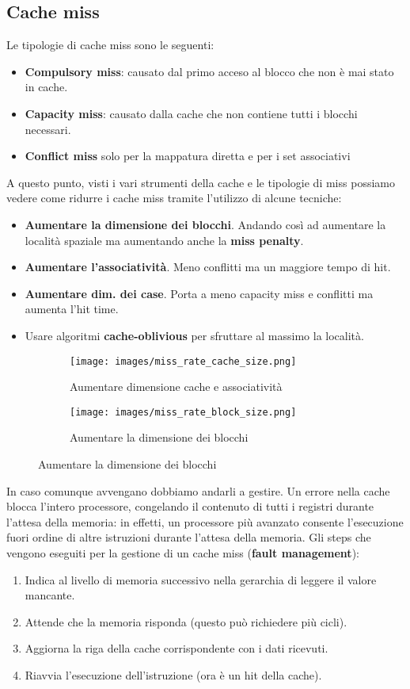 \subsection{Cache miss}
Le tipologie di cache miss sono le seguenti:
\begin{itemize}
	\item \textbf{Compulsory miss}: causato dal primo acceso al blocco che non è mai stato in cache.
	\item \textbf{Capacity miss}: causato dalla cache che non contiene tutti i blocchi necessari.
	\item \textbf{Conflict miss} solo per la mappatura diretta e per i set associativi
\end{itemize}
A questo punto, visti i vari strumenti della cache e le tipologie di miss possiamo vedere come ridurre i cache miss tramite l'utilizzo di alcune tecniche:
\begin{itemize}
	\item \textbf{Aumentare la dimensione dei blocchi}. Andando così ad aumentare la località spaziale ma aumentando anche la \textbf{miss penalty}.
	\item \textbf{Aumentare l'associatività}. Meno conflitti ma un maggiore tempo di hit.
	\item \textbf{Aumentare dim. dei case}. Porta a meno capacity miss e conflitti ma aumenta l'hit time.
	\item Usare algoritmi \textbf{cache-oblivious} per sfruttare al massimo la località.
\end{itemize}
\begin{figure}[h]
	\centering
	\begin{subfigure}{.45\textwidth}
		\centering
		\texttt{[image: images/miss\_rate\_cache\_size.png]}
		\caption{Aumentare dimensione cache e associatività}
	\end{subfigure}
	\begin{subfigure}{.45\textwidth}
		\centering
		\texttt{[image: images/miss\_rate\_block\_size.png]}
		\caption{Aumentare la dimensione dei blocchi}
	\end{subfigure}
\end{figure}

In caso comunque avvengano dobbiamo andarli a gestire. Un errore nella cache blocca l'intero processore, congelando il contenuto di tutti i registri durante l'attesa della memoria: in effetti, un processore più avanzato consente l'esecuzione fuori ordine di altre istruzioni durante l'attesa della memoria.
Gli steps che vengono eseguiti per la gestione di un cache miss (\textbf{fault management}):
\begin{enumerate}
	\item Indica al livello di memoria successivo nella gerarchia di leggere il valore mancante.
	\item Attende che la memoria risponda (questo può richiedere più cicli).
	\item Aggiorna la riga della cache corrispondente con i dati ricevuti.
	\item Riavvia l'esecuzione dell'istruzione (ora è un hit della cache).
\end{enumerate}

